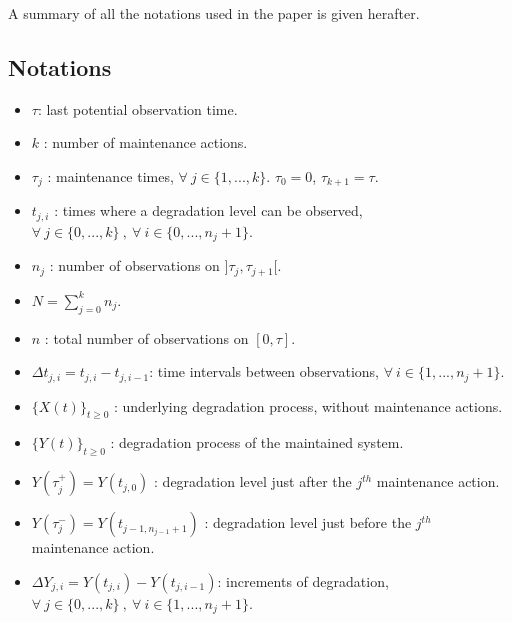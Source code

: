A summary of all the notations used in the paper is given herafter.


\subsection{Notations} 
\label{appendix:nots}

\begin{itemize}

\item $\tau$: last potential observation time.

\item $k$ : number of maintenance actions.

\item $\tau_j$ : maintenance times, $\forall\ j \in \{1,...,k\}$. $\tau_0=0$, $\tau_{k+1}=\tau$.

\item $t_{j,i}$ : times where a degradation level can be observed, $\forall\ j \in \{0,...,k\}\ ,\ \forall\ i \in \{0,...,n_j+1\}$.

\item $n_j$ : number of observations on $]\tau_j,\tau_{j+1}[$.

\item $N=\sum\limits_{j=0}^k n_j$.

\item $n$ : total number of observations on $[0,\tau]$.

\item $\Delta t_{j,i}=t_{j,i}-t_{j,i-1}$: time intervals between observations, $\forall\ i \in \{1,...,n_j+1\}$.

\item $\{X(t)\}_{t\geq 0}$ :  underlying degradation process, without maintenance actions.

\item $\{Y(t)\}_{t\geq 0}$ :  degradation process of the maintained system.

\item $Y(\tau_j^+)=Y(t_{j,0})$ : degradation level just after the $j^{th}$ maintenance action.

\item $Y(\tau_j^-)=Y(t_{j-1,n_{j-1}+1})$ : degradation level just before the $j^{th}$ maintenance action.

\item $\Delta Y_{j,i}=Y(t_{j,i})-Y(t_{j,i-1})$: increments of degradation, $\forall\ j \in \{0,...,k\}\ ,\ \forall\ i \in \{1,...,n_j+1\}$.


\end{itemize}
